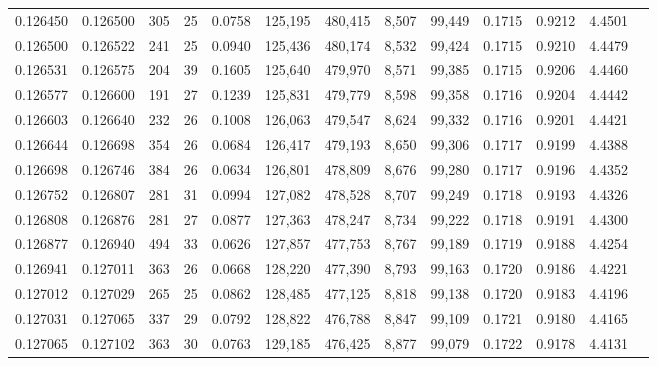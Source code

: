 \begin{tabular}{rrrrrrrrrrrrr}
0.126450 & 0.126500 &   305 &  25 &                                     0.0758 & 125,195 & 480,415 &   8,507 &  99,449 & 0.1715 & 0.9212 & 4.4501 \\
0.126500 & 0.126522 &   241 &  25 &                                     0.0940 & 125,436 & 480,174 &   8,532 &  99,424 & 0.1715 & 0.9210 & 4.4479 \\
0.126531 & 0.126575 &   204 &  39 &                                     0.1605 & 125,640 & 479,970 &   8,571 &  99,385 & 0.1715 & 0.9206 & 4.4460 \\
0.126577 & 0.126600 &   191 &  27 &                                     0.1239 & 125,831 & 479,779 &   8,598 &  99,358 & 0.1716 & 0.9204 & 4.4442 \\
0.126603 & 0.126640 &   232 &  26 &                                     0.1008 & 126,063 & 479,547 &   8,624 &  99,332 & 0.1716 & 0.9201 & 4.4421 \\
0.126644 & 0.126698 &   354 &  26 &                                     0.0684 & 126,417 & 479,193 &   8,650 &  99,306 & 0.1717 & 0.9199 & 4.4388 \\
0.126698 & 0.126746 &   384 &  26 &                                     0.0634 & 126,801 & 478,809 &   8,676 &  99,280 & 0.1717 & 0.9196 & 4.4352 \\
0.126752 & 0.126807 &   281 &  31 &                                     0.0994 & 127,082 & 478,528 &   8,707 &  99,249 & 0.1718 & 0.9193 & 4.4326 \\
0.126808 & 0.126876 &   281 &  27 &                                     0.0877 & 127,363 & 478,247 &   8,734 &  99,222 & 0.1718 & 0.9191 & 4.4300 \\
0.126877 & 0.126940 &   494 &  33 &                                     0.0626 & 127,857 & 477,753 &   8,767 &  99,189 & 0.1719 & 0.9188 & 4.4254 \\
0.126941 & 0.127011 &   363 &  26 &                                     0.0668 & 128,220 & 477,390 &   8,793 &  99,163 & 0.1720 & 0.9186 & 4.4221 \\
0.127012 & 0.127029 &   265 &  25 &                                     0.0862 & 128,485 & 477,125 &   8,818 &  99,138 & 0.1720 & 0.9183 & 4.4196 \\
0.127031 & 0.127065 &   337 &  29 &                                     0.0792 & 128,822 & 476,788 &   8,847 &  99,109 & 0.1721 & 0.9180 & 4.4165 \\
0.127065 & 0.127102 &   363 &  30 &                                     0.0763 & 129,185 & 476,425 &   8,877 &  99,079 & 0.1722 & 0.9178 & 4.4131 \\

\end{tabular}
